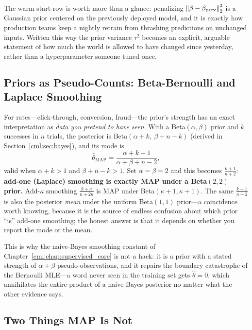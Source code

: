 The warm-start row is worth more than a glance: penalizing $\left\lVert\beta - \beta_{\text{prev}}\right\rVert_2^2$ is a Gaussian prior centered on the previously deployed model, and it is exactly how production teams keep a nightly retrain from thrashing predictions on unchanged inputs. Written this way the prior variance $\tau^2$ becomes an explicit, arguable statement of how much the world is allowed to have changed since yesterday, rather than a hyperparameter someone tuned once.

\subsection{Priors as Pseudo-Counts: Beta-Bernoulli and Laplace Smoothing}

For rates---click-through, conversion, fraud---the prior's strength has an exact interpretation as \textit{data you pretend to have seen}. With a Beta$(\alpha,\beta)$ prior and $k$ successes in $n$ trials, the posterior is Beta$(\alpha + k,\ \beta + n - k)$ (derived in Section~\ref{cml:sec:bayes}), and its mode is
\begin{equation}
\hat\theta_{\text{MAP}} = \frac{\alpha + k - 1}{\alpha + \beta + n - 2},
\end{equation}
valid when $\alpha + k > 1$ and $\beta + n - k > 1$. Set $\alpha = \beta = 2$ and this becomes $\frac{k+1}{n+2}$: \textbf{add-one (Laplace) smoothing is exactly MAP under a Beta$(2,2)$ prior.} Add-$\kappa$ smoothing $\frac{k+\kappa}{n+2\kappa}$ is MAP under Beta$(\kappa+1, \kappa+1)$. The same $\frac{k+1}{n+2}$ is also the posterior \textit{mean} under the uniform Beta$(1,1)$ prior---a coincidence worth knowing, because it is the source of endless confusion about which prior ``is'' add-one smoothing; the honest answer is that it depends on whether you report the mode or the mean.

This is why the naive-Bayes smoothing constant of Chapter~\ref{cml:chap:supervised_core} is not a hack: it is a prior with a stated strength of $\alpha+\beta$ pseudo-observations, and it repairs the boundary catastrophe of the Bernoulli MLE---a word never seen in the training set gets $\hat\theta = 0$, which annihilates the entire product of a naive-Bayes posterior no matter what the other evidence says.

\subsection{Two Things MAP Is Not}

